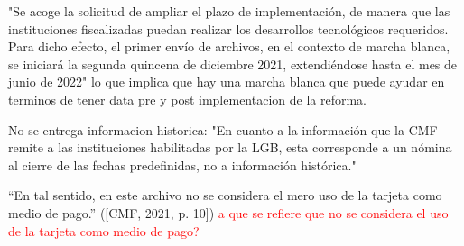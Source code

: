 \documentclass[12pt]{article}
\theoremstyle{plain}
\theoremstyle{plain}
\theoremstyle{definition}  %
\theoremstyle{remark}  %
\begin{document}
"Se acoge la solicitud de ampliar el plazo de implementación, de manera que las instituciones fiscalizadas puedan realizar los desarrollos tecnológicos requeridos. Para dicho efecto, el primer envío de archivos, en el contexto de marcha blanca, se iniciará la segunda quincena de diciembre 2021, extendiéndose hasta el mes de junio de 2022" lo que implica que hay una marcha blanca que puede ayudar en terminos de tener data pre y post implementacion de la reforma. 

No se entrega informacion historica: "En cuanto a la información que la CMF remite a las instituciones habilitadas por la LGB, esta corresponde a un nómina al cierre de las fechas predefinidas, no a información histórica." 

“En tal sentido, en este archivo no se considera el mero uso de la tarjeta como medio de pago.” ([CMF, 2021, p. 10]) \textcolor{red}{a que se refiere que no se considera el uso de la tarjeta como medio de pago?}
\end{document}
